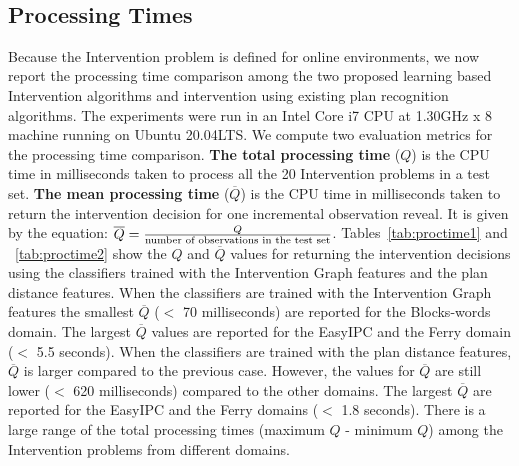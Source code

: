 ~\subsection{Processing Times}
Because the Intervention problem is defined for online environments, we now report the processing time comparison among the two proposed learning based Intervention algorithms and intervention using existing plan recognition algorithms.
The experiments were run in an Intel Core i7 CPU at 1.30GHz x 8 machine running on Ubuntu 20.04LTS.
We compute two evaluation metrics for the processing time comparison. 
\textbf{The total processing time} ($Q$) is the CPU time in milliseconds taken to process all the 20 Intervention problems in a test set.
\textbf{The mean processing time} ($\overline{Q}$) is the CPU time in milliseconds taken to return the intervention decision for one incremental observation reveal. 
It is given by the equation: $\overline{Q}=\frac{Q}{\textup{number of observations in the test set}}$.
Tables~\ref{tab:proctime1} and ~\ref{tab:proctime2} show the $Q$ and $\overline{Q}$ values for returning the intervention decisions using the classifiers trained with the Intervention Graph features and the plan distance features.
When the classifiers are trained with the Intervention Graph features the smallest $\overline{Q}$ ($<$ 70 milliseconds) are reported for the Blocks-words domain.
The largest $\overline{Q}$ values are reported for the EasyIPC and the Ferry domain ($<$ 5.5 seconds).
When the classifiers are trained with the plan distance features, $\overline{Q}$ is larger compared to the previous case.
However, the values for $\overline{Q}$ are still lower ($<$ 620 milliseconds) compared to the other domains.
The largest $\overline{Q}$ are reported for the EasyIPC and the Ferry domains ($<$ 1.8 seconds).
There is a large range of the total processing times (maximum $Q$ - minimum $Q$) among the Intervention problems from different domains.

